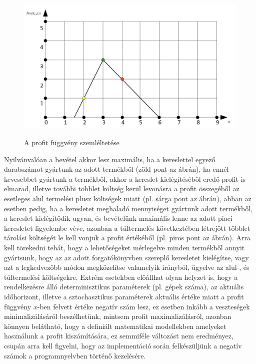 \documentclass [12pt]{report}
\begin{document}
\begin{figure}
\begin{center}
\includegraphics[scale=0.5]{profit_func}\\
\caption{A profit függvény szemléltetése}
\label{profit_func}
\end{center}
\end{figure}
Nyilvánvalóan a bevétel akkor lesz maximális, ha a kereslettel egyező darabszámot gyártunk az adott termékből (zöld pont az ábrán), ha ennél kevesebbet gyártunk a termékből, akkor a kereslet kielégítéséből eredő profit is elmarad, illetve további többlet költség kerül levonásra a profit összegéből az esetleges alul termelési plusz költségek miatt (pl. sárga pont az ábrán), abban az esetben pedig, ha a keresletet meghaladó mennyiséget gyártunk adott termékből, a kereslet kielégítődik ugyan, és bevételünk maximális lenne az adott piaci keresletet figyelembe véve, azonban a túltermelés következtében létrejött többlet tárolási költségét le kell vonjuk a profit értékéből (pl. piros pont az ábrán). Arra kell törekedni tehát, hogy a lehetőségeket mérlegelve minden termékből annyit gyártsunk, hogy az az adott forgatókönyvben szereplő keresletet kielégítse, vagy azt a legkedvezőbb módon megközelítse valamelyik irányból, ügyelve az alul-, és túltermelési költségekre. Extrém esetekben előállhat olyan helyzet is, hogy a rendelkezésre álló determinisztikus paraméterek (pl. gépek száma), az aktuális időhorizont, illetve a sztochasztikus paraméterek aktuális értéke miatt a profit függvény $x$-ben felvett értéke negatív szám lesz, ez esetben inkább a veszteségek minimalizálásáról beszélhetünk, mintsem profit maximalizálásról, azonban könnyen belátható, hogy a definiált matematikai modellekben amelyeket használunk a profit kiszámítására, ez semmiféle változást nem eredményez, csupán arra kell figyelni, hogy az implementáció során felkészüljünk a negatív számok a programnyelvben történő kezelésére.
\end{document}
